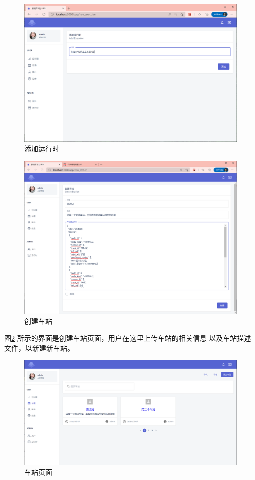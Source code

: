 \begin{figure}[htbp!]
  \centering
  \includegraphics[width=\textwidth]{figures/png/add_exes.png}
  \caption{\label{add_exes}添加运行时}
\end{figure}

\begin{figure}[htbp!]
  \centering
  \includegraphics[width=\textwidth]{figures/png/create_sta.png}
  \caption{\label{create_sta}创建车站}
\end{figure}

图\ref{create_sta} 所示的界面是创建车站页面，用户在这里上传车站的相关信息
以及车站描述文件，以新建新车站。

\begin{figure}[htbp!]
  \centering
  \includegraphics[width=\textwidth]{figures/png/station_list.png}
  \caption{\label{station_list}车站页面}
\end{figure}

